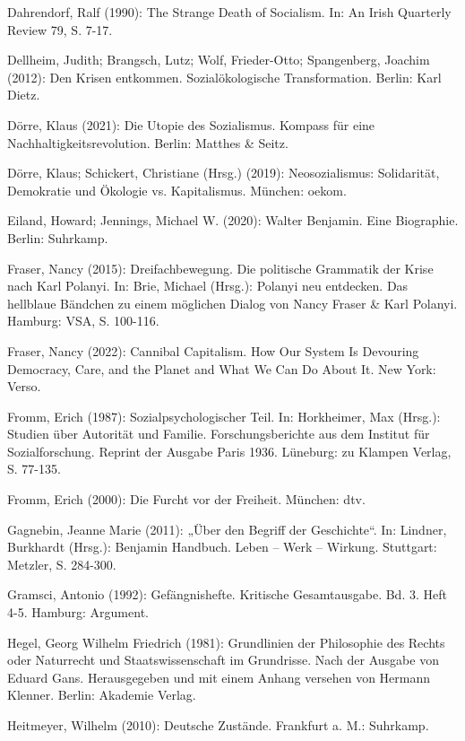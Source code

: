 \begin{multicols*}{2}
\begin{bibdescription}
        \item Dahrendorf, Ralf (1990): The Strange Death of Socialism. In: An Irish Quarterly Review 79, S. 7-17.
        \item Dellheim, Judith; Brangsch, Lutz; Wolf, Frieder-Otto; Spangenberg, Joachim (2012): Den Krisen entkommen. Sozialökologische Transformation. Berlin: Karl Dietz.
        \item Dörre, Klaus (2021): Die Utopie des Sozialismus. Kompass für eine Nachhaltigkeitsrevolution. Berlin: Matthes \& Seitz.
        \item Dörre, Klaus; Schickert, Christiane (Hrsg.) (2019): Neosozialismus: Solidarität, Demokratie und Ökologie vs. Kapitalismus. München: oekom.
        \item Eiland, Howard; Jennings, Michael W. (2020): Walter Benjamin. Eine Biographie. Berlin: Suhrkamp.
        \item Fraser, Nancy (2015): Dreifachbewegung. Die politische Grammatik der Krise nach Karl Polanyi. In: Brie, Michael (Hrsg.): Polanyi neu entdecken. Das hellblaue Bändchen zu einem möglichen Dialog von Nancy Fraser \& Karl Polanyi. Hamburg: VSA, S. 100-116.
        \item Fraser, Nancy (2022): Cannibal Capitalism. How Our System Is Devouring Democracy, Care, and the Planet and What We Can Do About It. New York: Verso.
        \item Fromm, Erich (1987): Sozialpsychologischer Teil. In: Horkheimer, Max (Hrsg.): Studien über Autorität und Familie. Forschungsberichte aus dem Institut für Sozialforschung. Reprint der Ausgabe Paris 1936. Lüneburg: zu Klampen Verlag, S. 77-135.
        \item Fromm, Erich (2000): Die Furcht vor der Freiheit. München: dtv.
        \item Gagnebin, Jeanne Marie (2011): „Über den Begriff der Geschichte“. In: Lindner, Burkhardt (Hrsg.): Benjamin Handbuch. Leben – Werk – Wirkung. Stuttgart: Metzler, S. 284-300.
        \item Gramsci, Antonio (1992): Gefängnishefte. Kritische Gesamtausgabe. Bd. 3. Heft 4-5. Hamburg: Argument.
        \item Hegel, Georg Wilhelm Friedrich (1981): Grundlinien der Philosophie des Rechts oder Naturrecht und Staatswissenschaft im Grundrisse. Nach der Ausgabe von Eduard Gans. Herausgegeben und mit einem Anhang versehen von Hermann Klenner. Berlin: Akademie Verlag.
        \item Heitmeyer, Wilhelm (2010): Deutsche Zustände. Frankfurt a. M.: Suhrkamp.

\end{bibdescription}
\end{multicols*}
